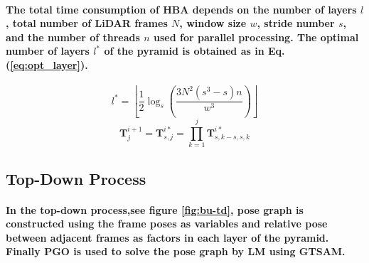 \paragraph{\textnormal{The total time consumption of HBA depends on the number of layers $\mathit{l}$, total number of LiDAR frames $N$, window size $\mathit{w}$, stride  number $\mathit{s}$, and the number of threads $\mathit{n}$ used for parallel processing. The optimal number of layers $\mathit{l^*}$ of the pyramid is obtained as in Eq.(\ref{eq:opt_layer}).
}}

\begin{equation}
	l^* = \left\lfloor \frac{1}{2} \log_s \left( \frac{3N^2 (s^3 - s) n}{w^3} \right) \right\rfloor
	\label{eq:opt_layer}
\end{equation}
\begin{equation}
	\mathbf{T}^{i+1}_j = \mathbf{T}^{i*}_{s,j} = \prod_{k=1}^{j} \mathbf{T}^{i*}_{s,k-s,s,k}
	\label{eq:nw_ps}
\end{equation}

\subsection{Top-Down Process}
\paragraph{\textnormal{In the top-down process,see figure \ref{fig:bu-td}, pose graph is constructed using the frame poses as variables and relative pose between adjacent frames as factors in each layer of the pyramid. Finally PGO is used to solve the pose graph by LM using GTSAM. 
}}


